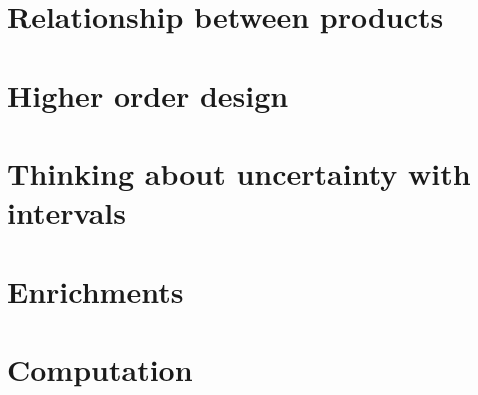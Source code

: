 \documentclass[paper=6in:9in,pagesize=pdftex,
 headinclude=off,footinclude=on,11pt,twoside]{scrbook}
\begin{document}
\chapter{Relationship between products}

\clearpage

\chapter{Higher order design}

\clearpage

\chapter{Thinking about uncertainty with intervals}

\clearpage

\chapter{Enrichments}

\clearpage

\chapter{Computation}



%
%
%
%

\printbibliography
\end{document}
